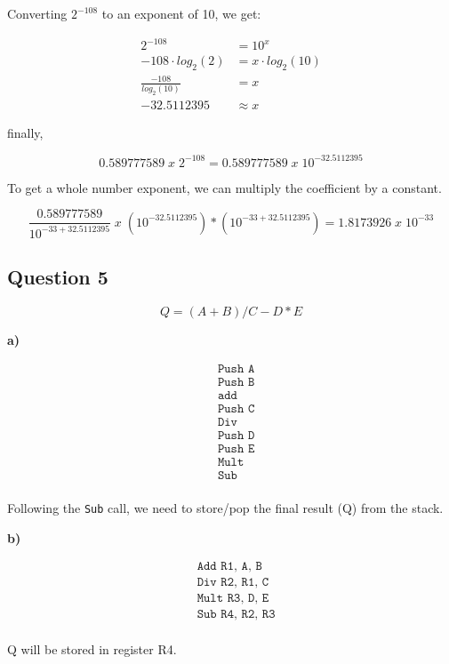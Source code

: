 \documentclass[a4paper,12pt]{article}
\def\code#1{\texttt{#1}}
\begin{document}
Converting $2^{-108}$ to an exponent of 10, we get:

\begin{align*}
    2^{-108} &= 10^{x} \\
    -108 \cdot log_2(2) &= x\cdot log_2(10) \\
    \frac{-108}{log_2(10)} &= x \\
    -32.5112395 &\approx x
\end{align*}

finally,

$$0.589777589 \; x \; 2^{-108} = 0.589777589 \; x \; 10^{-32.5112395}$$

To get a whole number exponent, we can multiply the coefficient by a constant.

$$\frac{0.589777589}{10^{-33+32.5112395}} \; x \; (10^{-32.5112395})*(10^{-33+32.5112395}) = 1.8173926 \; x \; 10^{-33}$$

\subsection*{Question 5}

$$Q = (A+B)/C - D*E$$

\textbf{a)} 

\begin{align*}
    &\code{Push A} \\
    &\code{Push B} \\
    &\code{add} \\
    &\code{Push C} \\
    &\code{Div} \\
    &\code{Push D} \\
    &\code{Push E} \\
    &\code{Mult} \\
    &\code{Sub} \\
\end{align*}

Following the \code{Sub} call, we need to store/pop the final result (Q) from the stack.

\textbf{b)}

\begin{align*}
    &\code{Add R1, A, B} \\
    &\code{Div R2, R1, C} \\
    &\code{Mult R3, D, E} \\
    &\code{Sub R4, R2, R3} \\
\end{align*}

Q will be stored in register R4.
\end{document}
